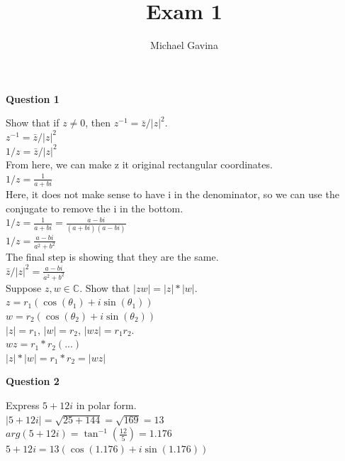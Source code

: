 \documentclass[12pt]{article}
\title{Exam 1}
\author{Michael Gavina}
\begin{document}
\maketitle


\begin{center}
\textbf{\large Question 1}
\end{center}

 Show that if $z \neq 0$, then $z^{-1} = \bar{z}/|z|^2$. \\
$z^{-1} = \bar{z}/|z|^2$\\
$1/z = \bar{z}/|z|^2$\\

From here, we can make z it original rectangular coordinates.\\
$1/z = \frac{1}{a+bi}$\\

Here, it does not make sense to have i in the denominator, so we can use the conjugate to remove the i in the bottom.\\
$1/z = \frac{1}{a+bi} = \frac{a-bi}{(a+bi)(a-bi)}$\\
$1/z =  \frac{a-bi}{a^2 + b^2}$\\

The final step is showing that they are the same.\\
$\bar{z}/|z|^2 = \frac{a-bi}{a^2 + b^2}$\\

 Suppose $z, w \in \mathbb{C}$. Show that $|zw| = |z| * |w|$. \\
$z = r_1(\cos(\theta_{1}) + i\sin(\theta_{1}))$\\
$w = r_2(\cos(\theta_{2}) + i\sin(\theta_{2}))$\\

$|z| = r_1$, $|w| = r_2$, $|wz| = r_1r_2$.\\

$wz = r_1*r_2(...)$\\

$|z| * |w| = r_1 * r_2 = |wz|$\\


\begin{center}
\textbf{\large Question 2}
\end{center}


 Express $5 + 12i$ in polar form. \\
$|5 + 12i| = \sqrt{25 + 144} = \sqrt{169} = 13$\\
$arg(5 + 12i) = \tan^{-1}(\frac{12}{5}) = 1.176$\\
$5 + 12i = 13(\cos(1.176) + i\sin(1.176))$\\
\end{document}

